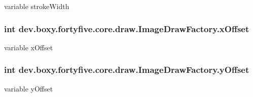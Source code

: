 variable strokeWidth \hypertarget{group__image_ga6be37b38c2cff42f387e0357b769f6df}{
\subsubsection[{xOffset}]{\setlength{\rightskip}{0pt plus 5cm}int {\bf dev.boxy.fortyfive.core.draw.ImageDrawFactory.xOffset}}}
\label{dd/d57/group__image_ga6be37b38c2cff42f387e0357b769f6df}
variable xOffset \hypertarget{group__image_ga7013263410dc0d0e0cfe528ce2f10eed}{
\subsubsection[{yOffset}]{\setlength{\rightskip}{0pt plus 5cm}int {\bf dev.boxy.fortyfive.core.draw.ImageDrawFactory.yOffset}}}
\label{dd/d57/group__image_ga7013263410dc0d0e0cfe528ce2f10eed}
variable yOffset 